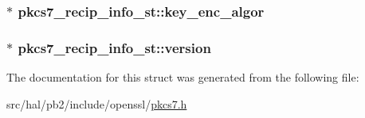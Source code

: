 \subsubsection[{\texorpdfstring{key\+\_\+enc\+\_\+algor}{key_enc_algor}}]{$\ast$ pkcs7\+\_\+recip\+\_\+info\+\_\+st\+::key\+\_\+enc\+\_\+algor}\hypertarget{structpkcs7__recip__info__st_ad337ba9cf15d47888dfff734116dbed5}{}\label{structpkcs7__recip__info__st_ad337ba9cf15d47888dfff734116dbed5}
\subsubsection[{\texorpdfstring{version}{version}}]{$\ast$ pkcs7\+\_\+recip\+\_\+info\+\_\+st\+::version}\hypertarget{structpkcs7__recip__info__st_a2dab371fc11bb2b2a31c8d6ae805b7d4}{}\label{structpkcs7__recip__info__st_a2dab371fc11bb2b2a31c8d6ae805b7d4}


The documentation for this struct was generated from the following file\+:\begin{DoxyCompactItemize}
\item 
src/hal/pb2/include/openssl/\hyperlink{pkcs7_8h}{pkcs7.\+h}\end{DoxyCompactItemize}
